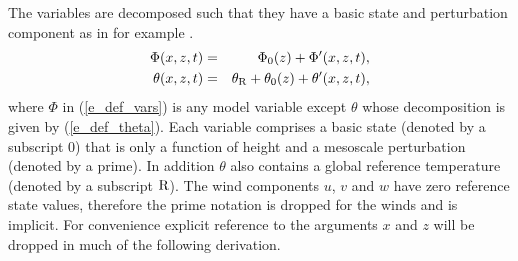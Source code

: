 \documentclass[times]{qjrms4}
\begin{document}
The variables are decomposed such that they have a basic state and perturbation component
as in for example \citet{pielke}.
   \begin{eqnarray} \label{basic_state}
     \Phi(x,z, t) &=& \Phi_0(z) + \Phi'(x,z, t), \label{e_def_vars} \\ 
     \theta(x,z, t) &=& \theta_{\rm R} + \theta_0(z) + \theta'(x,z, t), \label{e_def_theta}
   \end{eqnarray}
where $\Phi$ in (\ref{e_def_vars}) is any model variable except $\theta$ whose decomposition 
is given by (\ref{e_def_theta}).
Each variable comprises a basic state (denoted by a subscript $0$) that is only a function of height 
and a mesoscale perturbation (denoted by a prime). 
In addition $\theta$ also contains a global reference temperature (denoted by a subscript $\rm{R}$). 
The wind components $u$, $v$ and $w$ have zero reference state values, 
therefore the prime notation is dropped for the winds and is implicit. 
For convenience explicit reference to the arguments $x$ and $z$ will be dropped in much of the following derivation.  
\end{document}
